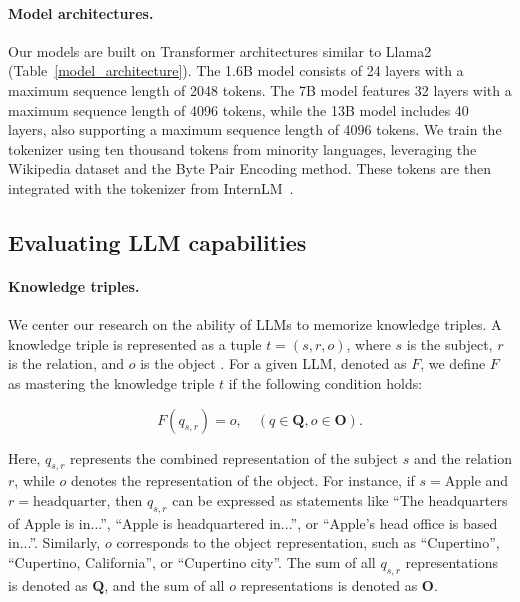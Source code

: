 \paragraph{Model architectures.} 
Our models are built on Transformer architectures similar to Llama2 (Table~\ref{model_architecture}). The 1.6B model consists of 24 layers with a maximum sequence length of 2048 tokens. The 7B model features 32 layers with a maximum sequence length of 4096 tokens, while the 13B model includes 40 layers, also supporting a maximum sequence length of 4096 tokens. We train the tokenizer using ten thousand tokens from minority languages, leveraging the Wikipedia dataset and the Byte Pair Encoding method. These tokens are then integrated with the tokenizer from InternLM~\cite{DBLP:journals/corr/abs-2403-17297}.


\subsection{Evaluating LLM capabilities}
\label{3-2}

\paragraph{Knowledge triples.}
We center our research on the ability of LLMs to memorize knowledge triples. A knowledge triple is represented as a tuple $t = (s, r, o)$, where $s$ is the subject, $r$ is the relation, and $o$ is the object \cite{DBLP:conf/acl/JuCY0DZL24}. For a given LLM, denoted as $F$, we define $F$ as mastering the knowledge triple $t$ if the following condition holds:

\begin{equation}
    F(q_{s,r}) = o, \quad (q \in \mathbf{Q}, o \in \mathbf{O}).
\end{equation}

Here, \(q_{s,r}\) represents the combined representation of the subject \(s\) and the relation \(r\), while \(o\) denotes the representation of the object. For instance, if \(s = \text{Apple}\) and \(r = \text{headquarter}\), then \(q_{s,r}\) can be expressed as statements like ``The headquarters of Apple is in...'', ``Apple is headquartered in...'', or ``Apple's head office is based in...''. Similarly, \(o\) corresponds to the object representation, such as ``Cupertino'', ``Cupertino, California'', or ``Cupertino city''. The sum of all \(q_{s,r}\) representations is denoted as \(\mathbf{Q}\), and the sum of all \(o\) representations is denoted as \(\mathbf{O}\).

